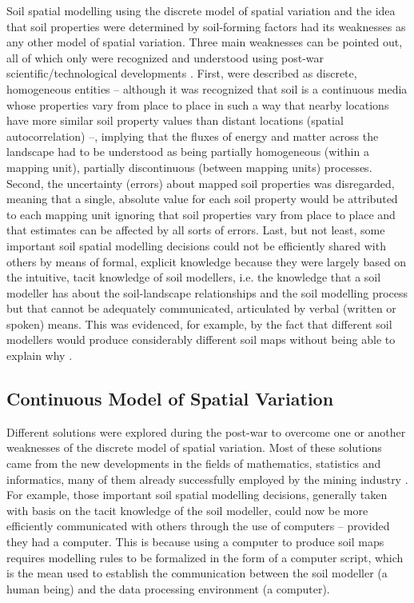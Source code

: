 Soil spatial modelling using the discrete model of spatial variation and the idea that soil properties were 
determined by soil-forming factors had its weaknesses as any other model of spatial variation. Three main 
weaknesses can be pointed out, all of which only were recognized and understood using post-war 
scientific/technological developments \cite{HeuvelinkEtAl2001, McBratneyEtAl2003, ScullEtAl2003}. First, 
 were described as discrete, homogeneous entities -- although it was recognized that soil is a 
continuous media whose properties vary from place to place in such a way that nearby locations have more 
similar soil property values than distant locations (spatial autocorrelation) --, implying that the fluxes of 
energy and matter across the landscape had to be understood as being partially homogeneous (within a mapping 
unit), partially discontinuous (between mapping units) processes. Second, the uncertainty (errors) about mapped 
soil properties was disregarded, meaning that a single, absolute value for each soil property would be 
attributed to each mapping unit ignoring that soil properties vary from place to place and that estimates can 
be affected by all sorts of errors. Last, but not least, some important soil spatial modelling decisions could 
not be efficiently shared with others by means of formal, explicit knowledge because they were largely based on 
the intuitive, tacit knowledge of soil modellers, i.e. the knowledge that a soil modeller has about the 
soil-landscape relationships and the soil modelling process but that cannot be adequately communicated, 
articulated by verbal (written or spoken) means. This was evidenced, for example, by the fact that different 
soil modellers would produce considerably different soil maps without being able to explain why 
\cite{Legros2006, BazagliaFilhoEtAl2013}.

\subsection{Continuous Model of Spatial Variation}

Different solutions were explored during the post-war to overcome one or another weaknesses of the discrete 
model of spatial variation. Most of these solutions came from the new developments in the fields of 
mathematics, statistics and informatics, many of them already successfully employed by the mining industry 
\cite{Matheron1969}. For example, those important soil spatial modelling decisions, generally taken with basis 
on the tacit knowledge of the soil modeller, could now be more efficiently communicated with others through the 
use of computers -- provided they had a computer. This is because using a computer to produce soil maps 
requires modelling rules to be formalized in the form of a computer script, which is the mean used to establish 
the communication between the soil modeller (a human being) and the data processing environment (a computer).

